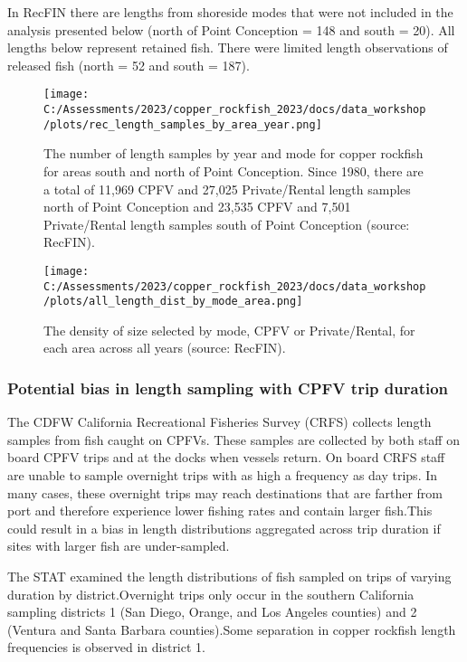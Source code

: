 \documentclass[
]{article}
\begin{document}
In RecFIN there are lengths from shoreside modes that were not included
in the analysis presented below (north of Point Conception = 148 and
south = 20). All lengths below represent retained fish. There were
limited length observations of released fish (north = 52 and south =
187).

\begin{figure}
\centering
\texttt{[image: C:/Assessments/2023/copper\_rockfish\_2023/docs/data\_workshop/plots/rec\_length\_samples\_by\_area\_year.png]}
\caption{The number of length samples by year and mode for copper
rockfish for areas south and north of Point Conception. Since 1980,
there are a total of 11,969 CPFV and 27,025 Private/Rental length
samples north of Point Conception and 23,535 CPFV and 7,501
Private/Rental length samples south of Point Conception (source:
RecFIN).\label{fig:rec-length-samples}}
\end{figure}

\begin{figure}
\centering
\texttt{[image: C:/Assessments/2023/copper\_rockfish\_2023/docs/data\_workshop/plots/all\_length\_dist\_by\_mode\_area.png]}
\caption{The density of size selected by mode, CPFV or Private/Rental,
for each area across all years (source:
RecFIN).\label{fig:rec-length-dist}}
\end{figure}

\hypertarget{potential-bias-in-length-sampling-with-cpfv-trip-duration}{%
\subsubsection{Potential bias in length sampling with CPFV trip
duration}\label{potential-bias-in-length-sampling-with-cpfv-trip-duration}}

The CDFW California Recreational Fisheries Survey (CRFS) collects length
samples from fish caught on CPFVs. These samples are collected by both
staff on board CPFV trips and at the docks when vessels return. On board
CRFS staff are unable to sample overnight trips with as high a frequency
as day trips. In many cases, these overnight trips may reach
destinations that are farther from port and therefore experience lower
fishing rates and contain larger fish.This could result in a bias in
length distributions aggregated across trip duration if sites with
larger fish are under-sampled.

The STAT examined the length distributions of fish sampled on trips of
varying duration by district.Overnight trips only occur in the southern
California sampling districts 1 (San Diego, Orange, and Los Angeles
counties) and 2 (Ventura and Santa Barbara counties).Some separation in
copper rockfish length frequencies is observed in district 1.
\end{document}

